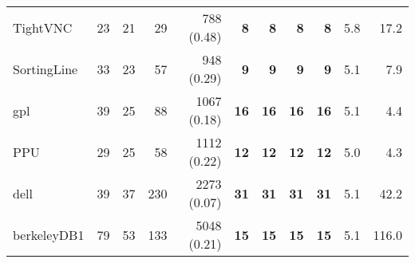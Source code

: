 \begin{table*}
\begin{tiny}
{{\begin{tabular}{lrrrrrrrrrr}
TightVNC & \num[text-series-to-math=true]{23} & \num[text-series-to-math=true]{21} & \num[text-series-to-math=true]{29} & \num[text-series-to-math=true]{788} (\num[text-series-to-math=true]{0.48}) & \textbf{\num[text-series-to-math=true]{8}} & \textbf{\num[text-series-to-math=true]{8}} & \textbf{\num[text-series-to-math=true]{8}} & \textbf{\num[text-series-to-math=true]{8}} & 5.8 & 17.2\\
SortingLine & \num[text-series-to-math=true]{33} & \num[text-series-to-math=true]{23} & \num[text-series-to-math=true]{57} & \num[text-series-to-math=true]{948} (\num[text-series-to-math=true]{0.29}) & \textbf{\num[text-series-to-math=true]{9}} & \textbf{\num[text-series-to-math=true]{9}} & \textbf{\num[text-series-to-math=true]{9}} & \textbf{\num[text-series-to-math=true]{9}} & 5.1 & 7.9\\
gpl & \num[text-series-to-math=true]{39} & \num[text-series-to-math=true]{25} & \num[text-series-to-math=true]{88} & \num[text-series-to-math=true]{1067} (\num[text-series-to-math=true]{0.18}) & \textbf{\num[text-series-to-math=true]{16}} & \textbf{\num[text-series-to-math=true]{16}} & \textbf{\num[text-series-to-math=true]{16}} & \textbf{\num[text-series-to-math=true]{16}} & 5.1 & 4.4\\
PPU & \num[text-series-to-math=true]{29} & \num[text-series-to-math=true]{25} & \num[text-series-to-math=true]{58} & \num[text-series-to-math=true]{1112} (\num[text-series-to-math=true]{0.22}) & \textbf{\num[text-series-to-math=true]{12}} & \textbf{\num[text-series-to-math=true]{12}} & \textbf{\num[text-series-to-math=true]{12}} & \textbf{\num[text-series-to-math=true]{12}} & 5.0 & 4.3\\
dell & \num[text-series-to-math=true]{39} & \num[text-series-to-math=true]{37} & \num[text-series-to-math=true]{230} & \num[text-series-to-math=true]{2273} (\num[text-series-to-math=true]{0.07}) & \textbf{\num[text-series-to-math=true]{31}} & \textbf{\num[text-series-to-math=true]{31}} & \textbf{\num[text-series-to-math=true]{31}} & \textbf{\num[text-series-to-math=true]{31}} & 5.1 & 42.2\\
berkeleyDB1 & \num[text-series-to-math=true]{79} & \num[text-series-to-math=true]{53} & \num[text-series-to-math=true]{133} & \num[text-series-to-math=true]{5048} (\num[text-series-to-math=true]{0.21}) & \textbf{\num[text-series-to-math=true]{15}} & \textbf{\num[text-series-to-math=true]{15}} & \textbf{\num[text-series-to-math=true]{15}} & \textbf{\num[text-series-to-math=true]{15}} & 5.1 & 116.0\\

\end{tabular}}}
\end{tiny}
\end{table*}
